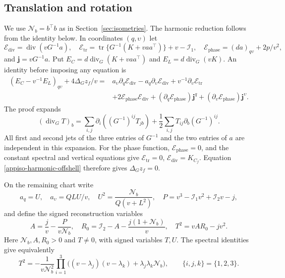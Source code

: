 \documentclass[11pt,a4paper]{article}
\numberwithin{equation}{section}
\theoremstyle{plain}
\theoremstyle{definition}
\theoremstyle{remark}
\begin{document}
\subsection{Translation and rotation}\label{appiso-trs-source}
We use $\mathcal N_b=b^{\top}b$ as in Section~\ref{sec:isometries}.
The harmonic reduction follows from the identity below.  In coordinates $(q,\upsilon)$ let
\[
 \mathcal E_{\mathrm{div}}=\operatorname{div}(vG^{-1}a),\quad
 \mathcal E_{\mathrm{tr}}=\operatorname{tr}\{G^{-1}(K+vaa^{\top})\}+v-\mathcal I_1,\quad
 \mathcal E_{\mathrm{phase}}=(da)_{q\upsilon}+2p/v^2,
\]
and $\boldsymbol j=vG^{-1}a$.  Put $E_C=d\operatorname{div}_G(K+vaa^{\top})$ and
$E_L=d\operatorname{div}_G(vK)$.  An identity before imposing any
equation is
\begin{align}
 (E_C-v^{-1}E_L)_{q\upsilon}+4\Delta_Gz_f/v
  ={}&a_\upsilon\partial_q\mathcal E_{\mathrm{div}}-a_q\partial_\upsilon\mathcal E_{\mathrm{div}}
       +v^{-1}\partial_\upsilon\mathcal E_{\mathrm{tr}}\nonumber\\
    &+2\mathcal E_{\mathrm{phase}}\mathcal E_{\mathrm{div}}+
       (\partial_q\mathcal E_{\mathrm{phase}})\boldsymbol j^q+
       (\partial_\upsilon\mathcal E_{\mathrm{phase}})\boldsymbol j^\upsilon.
 \label{appiso-harmonic-offshell}
\end{align}
The proof expands
\[
 (\operatorname{div}_G T)_b
 =\sum_{i,j}\partial_i((G^{-1})^{ij}T_{jb})
             +\frac12\sum_{i,j}T_{ij}\partial_b(G^{-1})^{ij}.
\]
All first and second jets of the three entries of $G^{-1}$ and the two entries
of $a$ are independent in this expansion. For the phase function,
$\mathcal E_{\mathrm{phase}}=0$, and the constant spectral and vertical equations give
$\mathcal E_{\mathrm{tr}}=0$, $\mathcal E_{\mathrm{div}}=K_{C_f}$.  Equation
\eqref{appiso-harmonic-offshell} therefore gives $\Delta_Gz_f=0$.

On the remaining chart write
\begin{equation}\label{iso:trs-shape}
 a_q=U,\quad a_\upsilon=QLU/v,\quad
 U^2=\frac{\mathcal N_b}{Q(v+L^2)},\quad
 P=v^3-\mathcal I_1v^2+\mathcal I_2v-j,
\end{equation}
and define the signed reconstruction variables
\begin{equation}\label{iso:trs-AT}
 A=\frac jv-\frac{P}{v\mathcal N_b},\quad
 R_0=\mathcal I_2-A-\frac{j(1+\mathcal N_b)}v,\quad
 T^2=vAR_0-jv^2.
\end{equation}
Here $\mathcal N_b,A,R_0>0$ and $T\ne0$, with signed variables $T,U$.
The spectral identities give equivalently
\[
 T^2=-\frac1{v\mathcal N_b^2}
 \prod_{i=1}^3\bigl((v-\lambda_j)(v-\lambda_k)
                       +\lambda_j\lambda_k \mathcal N_b\bigr),
 \qquad \{i,j,k\}=\{1,2,3\}.
\]
\end{document}
